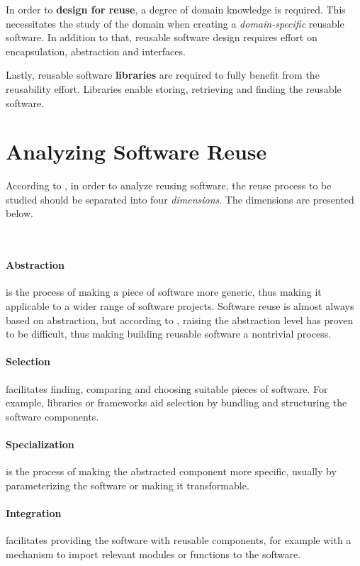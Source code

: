 In order to \textbf{design for reuse}, a degree of domain knowledge is required. This necessitates the study of the domain when creating a \emph{domain-specific} reusable software. In addition to that, reusable software design requires effort on encapsulation, abstraction and interfaces.

Lastly, reusable software \textbf{libraries} are required to fully benefit from the reusability effort. Libraries enable storing, retrieving and finding the reusable software.

\section{Analyzing Software Reuse}
According to \citet{krueger_software_1992}, in order to analyze reusing software, the reuse process to be studied should be separated into four \emph{dimensions}. The dimensions are presented below.

~

\paragraph{Abstraction} is the process of making a piece of software more generic, thus making it applicable to a wider range of software projects. Software reuse is almost always based on abstraction, but according to \citet{krueger_software_1992}, raising the abstraction level has proven to be difficult, thus making building reusable software a nontrivial process.

\paragraph{Selection} facilitates finding, comparing and choosing suitable pieces of software. For example, libraries or frameworks aid selection by bundling and structuring the software components.

\paragraph{Specialization} is the process of making the abstracted component more specific, usually by parameterizing the software or making it transformable.

\paragraph{Integration} facilitates providing the software with reusable components, for example with a mechanism to import relevant modules or functions to the software.

